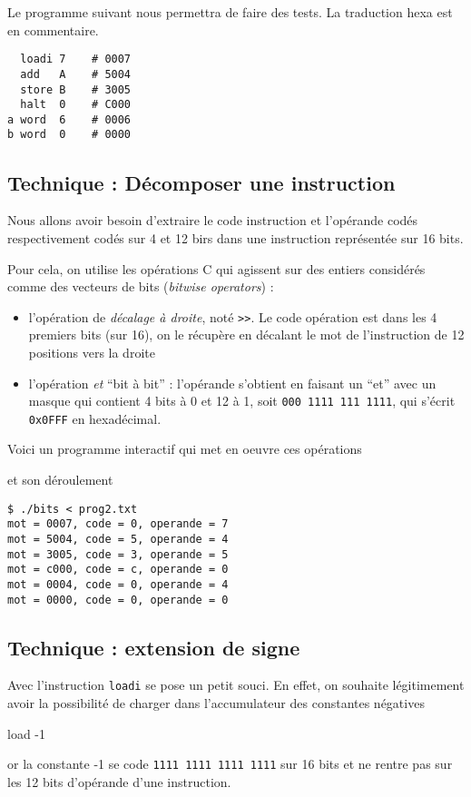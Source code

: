 \documentclass[10pt]{article}
\begin{document}
Le programme suivant nous permettra de faire des tests. La traduction 
hexa est en commentaire.
\begin{verbatim}
  loadi 7    # 0007
  add   A    # 5004
  store B    # 3005
  halt  0    # C000
a word  6    # 0006
b word  0    # 0000
\end{verbatim}

\subsection{Technique : Décomposer une instruction}

Nous allons avoir besoin d'extraire 
le code instruction et l'opérande codés respectivement codés sur 4 et 12 birs dans une instruction représentée
sur 16 bits.

Pour cela, on utilise les opérations C qui agissent sur des entiers
considérés comme des vecteurs de bits (\emph{bitwise operators}) :
\begin{itemize}
\item l'opération de \emph{décalage à droite}, noté \verb/>>/.
Le code opération est dans les 4 premiers bits (sur 16), on le récupère en décalant le mot de l'instruction de 12 positions vers la droite 
\item l'opération \emph{et} ``bit à bit'' : l'opérande  s'obtient en faisant un ``et'' avec un masque qui contient 4 bits à 0 et 12 à 1, soit \texttt{000 1111 111 1111}, qui s'écrit \texttt{0x0FFF} en hexadécimal.
\end{itemize}


Voici un programme interactif qui met en oeuvre ces opérations



et son déroulement

\begin{verbatim}
$ ./bits < prog2.txt 
mot = 0007, code = 0, operande = 7
mot = 5004, code = 5, operande = 4
mot = 3005, code = 3, operande = 5
mot = c000, code = c, operande = 0
mot = 0004, code = 0, operande = 4
mot = 0000, code = 0, operande = 0
\end{verbatim}

\subsection{Technique : extension de signe}

Avec l'instruction \texttt{loadi} se pose un petit souci. En effet, on
souhaite légitimement avoir la possibilité de charger dans l'accumulateur des constantes négatives
\begin{center}
load -1
\end{center}
or la constante -1 se code  \texttt{1111 1111 1111 1111} sur 16 bits
et ne rentre pas sur les 12 bits d'opérande d'une instruction.
\end{document}
